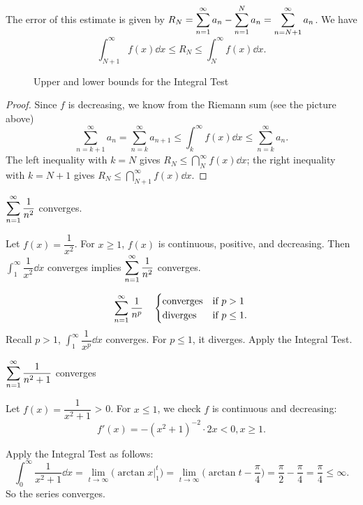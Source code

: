The error of this estimate is given by $R_N = \displaystyle\sum_{n=1}^\infty a_n - \displaystyle\sum_{n=1}^N a_n = \displaystyle\sum_{n=N+1}^\infty a_n$. We have 
\[\int_{N+1}^\infty f(x) \dd x \leq R_N \leq \int_{N}^\infty f(x) \dd x.\]
\begin{figure}[h]
    \centering
    \resizebox{0.85\textwidth}{!}{
    
    \quad
    } %
    \label{fig:Riemann sums}
    \caption{Upper and lower bounds for the Integral Test}
\end{figure}
\begin{proof}
    Since $f$ is decreasing, we know from the Riemann sum (see the picture above)
    \[ \sum_{n=k+1}^\infty a_n = \sum_{n=k}^\infty a_{n+1} \leq \int_k^\infty f(x) \dd x \leq \sum_{n=k}^\infty a_n.\]
    The left inequality with $k=N$ gives $R_N \leq \dint_N^\infty f(x) \dd x$; the right inequality with $k=N+1$ gives $R_N \leq \dint_{N+1}^\infty f(x) \dd x$. 
\end{proof}



\begin{ex} $\displaystyle\sum_{n=1}^\infty \dfrac{1}{n^2}$ converges.

Let $f(x) = \dfrac{1}{x^2}$. For $x \geq 1$, $f(x)$ is continuous, positive, and decreasing. Then $\displaystyle \int_1^\infty \dfrac{1}{x^2} \dd x $ converges implies $\displaystyle\sum_{n=1}^\infty \dfrac{1}{n^2}$ converges.
\end{ex}

\begin{ex}
\begin{align*}
    \displaystyle\sum_{n=1}^\infty  \dfrac{1}{n^p} \quad \begin{cases} 
    \text{converges}  & \text{if } p > 1 \\
    \text{diverges} & \text{if } p \leq 1.
\end{cases}
\end{align*}
Recall $p > 1$, $\int_1^\infty \dfrac{1}{x^p} \dd x$ converges. For $p \leq 1$, it diverges. Apply the Integral Test.
\end{ex}

\begin{ex}
    $\displaystyle\sum_{n=1}^\infty  \dfrac{1}{n^2+1} $ converges
\end{ex}
Let $f(x) = \dfrac{1}{x^2+1}$ > 0. For $x \leq 1$, we check $f$ is continuous and decreasing: 
\[f'(x) = -(x^2+1)^{-2} \cdot 2x < 0, x \geq 1.\]

Apply the Integral Test as follows:
\[\int_0^\infty \dfrac{1}{x^2+1} \dd x = \lim_{t \to \infty} \Big(\arctan x |_1^t \Big) = \lim_{t \to \infty} \Big(\arctan t - \dfrac{\pi}{4} \Big) = \dfrac{\pi}{2}- \dfrac{\pi}{4} = \dfrac{\pi}{4} \leq \infty.\]
So the series converges.

